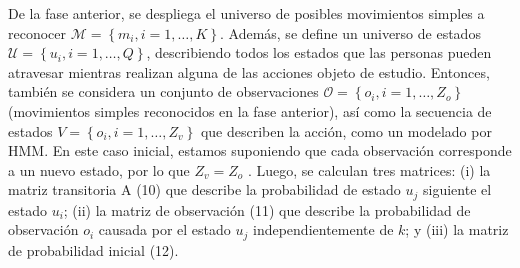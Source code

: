 \documentclass[10pt]{article}
\begin{document}
De la fase anterior, se despliega el universo de posibles movimientos simples a reconocer $\mathcal{M}=\left\{m_{i}, i=1, \ldots, K\right\}$. Además, se define un universo de estados $\mathcal{U}=\left\{u_{i}, i=1, \ldots, Q\right\}$,  describiendo todos los estados que las personas pueden atravesar mientras realizan alguna de las acciones objeto de estudio. Entonces, también se considera un conjunto de observaciones $\mathcal{O}=\left\{o_{i}, i=1, \ldots, Z_{o}\right\}$ (movimientos simples reconocidos en la fase anterior), así como la secuencia de estados $V=\left\{o_{i}, i=1, \ldots, Z_{v}\right\}$ que describen la acción, como un modelado por HMM. En este caso inicial, estamos suponiendo que cada observación corresponde a un nuevo estado, por lo que  $Z_{v}=Z_{o}$ . Luego, se calculan tres matrices: (i) la matriz transitoria  A (10) que describe la probabilidad de estado $u_{j}$ siguiente el estado $u_{i}$; (ii) la matriz de observación (11) que describe la probabilidad de observación $o_{i}$ causada por el estado $u_{j}$ independientemente de $k$; y (iii) la matriz de probabilidad inicial (12).
\end{document}

